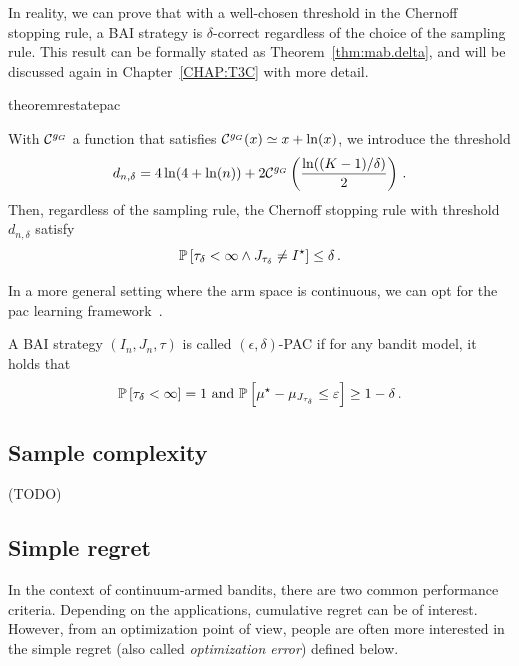 In reality, we can prove that with a well-chosen threshold in the Chernoff stopping rule, a BAI strategy is $\delta$-correct regardless of the choice of the sampling rule. This result can be formally stated as Theorem~\ref{thm:mab.delta}, and will be discussed again in Chapter~\ref{CHAP:T3C} with more detail.

\begin{restatable}{theorem}{restatepac}\label{thm:mab.delta}
\begin{leftbar}[theorembar]
With $\mathcal{C}^{g_G}$ a function that satisfies $\mathcal{C}^{g_G}(x) \simeq x+\ln(x)$, we introduce the threshold
\begin{equation}
    d_{n,\delta} = 4\ln(4+\ln(n)) + 2 \mathcal{C}^{g_G}\left(\frac{\ln((K-1)/\delta)}{2}\right)\,.\label{def:mab.threshold_d}
\end{equation}
Then, regardless of the sampling rule, the Chernoff stopping rule with threshold $d_{n,\delta}$ satisfy 
\[ 
    \mathbb{P}\left[\tau_{\delta} < \infty \wedge J_{\tau_{\delta}} \neq I^\star\right] \leq \delta\,.
\]
\end{leftbar}
\end{restatable}

In a more general setting where the arm space is continuous, we can opt for the \gls{pac} learning framework~\citep{valiant1984pac}.

\begin{definition}\label{def:mab.pac}
\begin{leftbar}[defnbar]
A BAI strategy $(I_n,J_n,\tau)$ is called $(\epsilon,\delta)$-PAC if for any bandit model, it holds that
\[
	\mathbb{P}\left[\tau_\delta < \infty\right] = 1 \text{ and } \mathbb{P}\left[\mu^\star-\mu_{J_{\tau_\delta}}\leq \varepsilon\right] \geq 1-\delta\,.
\]
\end{leftbar}
\end{definition}

\subsection{Sample complexity}\label{sec:mab.performance.sample}

(TODO)

\subsection{Simple regret}\label{sec:mab.performance.simple}

In the context of continuum-armed bandits, there are two common performance criteria. Depending on the applications, cumulative regret can be of interest. However, from an optimization point of view, people are often more interested in the \gls{simple regret} (also called \emph{optimization error}) defined below. 

